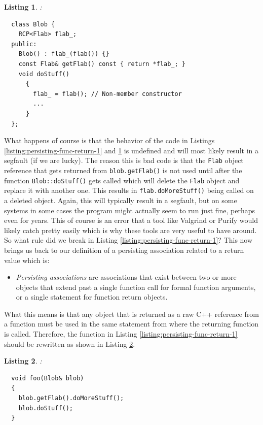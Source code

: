 \documentclass[pdf,ps2pdf,11pt]{SANDreport}
\newtheorem{listing}{Listing}
\begin{document}
\begin{listing}:\\
\label{listing:bad-Blob-non-persisting}
{\small\begin{verbatim}
  class Blob {
    RCP<Flab> flab_;
  public:
    Blob() : flab_(flab()) {}
    const Flab& getFlab() const { return *flab_; }
    void doStuff()
      {
        flab_ = flab(); // Non-member constructor
        ...
      }
  };
\end{verbatim}}
\end{listing}

What happens of course is that the behavior of the code in Listings
{}\ref{listing:persisting-func-return-1} and
{}\ref{listing:bad-Blob-non-persisting} is undefined and will most
likely result in a segfault (if we are lucky).  The reason this is bad
code is that the {}\texttt{Flab} object reference that gets returned
from {}\texttt{blob.getFlab()} is not used until after the function
{}\texttt{Blob::doStuff()} gets called which will delete the
{}\texttt{Flab} object and replace it with another one.  This results
in {}\texttt{flab.doMoreStuff()} being called on a deleted object.
Again, this will typically result in a segfault, but on some systems
in some cases the program might actually seem to run just fine,
perhaps even for years.  This of course is an error that a tool like
Valgrind or Purify would likely catch pretty easily which is why these
tools are very useful to have around.  So what rule did we break in
Listing {}\ref{listing:persisting-func-return-1}?  This now brings us
back to our definition of a persisting association related to a return
value which is:

\begin{itemize}

{}\item\textit{Persisting associations} are associations that exist
between two or more objects that extend past a single function call
for formal function arguments, or a single statement for function
return objects.

\end{itemize}

What this means is that any object that is returned as a raw C++
reference from a function must be used in the same statement from
where the returning function is called.  Therefore, the function in
Listing {}\ref{listing:persisting-func-return-1} should be rewritten
as shown in Listing {}\ref{listing:non-persisting-func-return-1}.

\begin{listing}:\\
\label{listing:non-persisting-func-return-1}
{\small\begin{verbatim}
  void foo(Blob& blob)
  {
    blob.getFlab().doMoreStuff();
    blob.doStuff();
  }
\end{verbatim}}
\end{listing}
\end{document}
